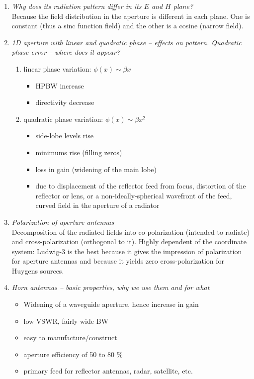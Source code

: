 \documentclass[11pt,a4paper]{article}
\begin{document}
\begin{enumerate}
    \item \emph{Why does its radiation pattern differ in its $E$ and $H$ plane?}\\
    Because the field distribution in the aperture is different in each plane. One is constant (thus a sinc function field) and the other is a cosine (narrow field).

    \item \emph{1D aperture with linear and quadratic phase -- effects on pattern. Quadratic phase error -- where does it appear?}
    \begin{enumerate}[label=(\alph*)]
        \item linear phase variation: $\phi(x) \sim \beta x$
        \begin{itemize}
            \item HPBW increase
            \item directivity decrease
        \end{itemize}
        \item quadratic phase variation: $\phi(x) \sim \beta x^2$
        \begin{itemize}
            \item side-lobe levels rise
            \item minimums rise (filling zeros)
            \item loss in gain (widening of the main lobe)
            \item due to displacement of the reflector feed from focus, distortion of the reflector or lens, or a non-ideally-spherical wavefront of the feed, curved field in the aperture of a radiator
        \end{itemize}
    \end{enumerate}

    \item \emph{Polarization of aperture antennas}\\
    Decomposition of the radiated fields into co-polarization (intended to radiate) and cross-polarization (orthogonal to it). Highly dependent of the coordinate system: Ludwig-3 is the best because it gives the impression of polarization for aperture antennas and because it yields zero cross-polarization for Huygens sources.
    
    \item \emph{Horn antennas -- basic properties, why we use them and for what}
    \begin{itemize}
        \item Widening of a waveguide aperture, hence increase in gain
        \item low VSWR, fairly wide BW
        \item easy to manufacture/construct
        \item aperture efficiency of 50 to 80 \%
        \item primary feed for reflector antennas, radar, satellite, etc.
    \end{itemize}
    

\end{enumerate}
\end{document}
